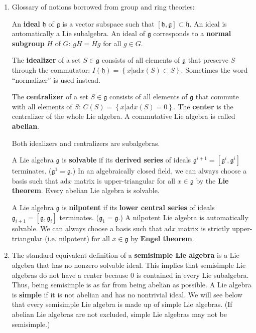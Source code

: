 \documentclass[aps,nofootinbib]{revtex4}
\begin{document}
\begin{enumerate}

\item \label{glossary} Glossary of notions borrowed from group and ring theories:

An \textbf{ideal} $\mathfrak{h}$ of $\mathfrak{g}$ is a vector subspace
such that $\left[\mathfrak{h},\mathfrak{g}\right]\subset\mathfrak{h}$.
An ideal is automatically a Lie subalgebra. An ideal of $\mathfrak{g}$
corresponds to a \textbf{normal subgroup} $H$ of $G$: $gH=Hg$ for
all $g\in G$.

The \textbf{idealizer }of a set $S\in\mathfrak{g}$ consists of all
elements of $\mathfrak{g}$ that preserve $S$ through the commutator:\textbf{
}$I\left(\mathfrak{h}\right)=\left\{ x|\mbox{ad}x\left(S\right)\subset S\right\} $.
Sometimes the word ``normalizer'' is used instead.

The \textbf{centralizer }of a set $S\in\mathfrak{g}$ consists of
all elements of $\mathfrak{g}$ that commute with all elements of
$S$: $C\left(S\right)=\left\{ x|\mbox{ad}x\left(S\right)=0\right\} $.
The \textbf{center }is the centralizer of the whole Lie algebra. A
commutative Lie algebra is called \textbf{abelian}.

Both idealizers and centralizers are subalgebras.

A Lie algebra $\mathfrak{g}$ is \textbf{solvable }if its \textbf{derived
series }of ideals\textbf{ }$\mathfrak{g}^{i+1}=\left[\mathfrak{g}^{i},\mathfrak{g}^{i}\right]$
terminates. ($\mathfrak{g}^{1}=\mathfrak{g}$.) In an algebraically
closed field, we can always choose a basis such that $\mbox{ad}x$
matrix is upper-triangular for all $x\in\mathfrak{g}$ by the \textbf{Lie
theorem}. Every abelian Lie algebra is solvable.

A Lie algebra $\mathfrak{g}$ is \textbf{nilpotent }if its \textbf{lower
central series }of ideals\textbf{ }$\mathfrak{g}_{i+1}=\left[\mathfrak{g},\mathfrak{g}_{i}\right]$
terminates. ($\mathfrak{g}_{1}=\mathfrak{g}$.) A nilpotent Lie algebra
is automatically solvable. We can always choose a basis such that
$\mbox{ad}x$ matrix is strictly upper-triangular (i.e. nilpotent)
for all $x\in\mathfrak{g}$ by \textbf{Engel theorem}.

\item The standard equivalent definition of a \textbf{semisimple Lie
algebra} is a Lie algebra that has no nonzero solvable ideal. This
implies that semisimple Lie algebras do not have a center because
0 is contained in every Lie subalgebra. Thus, being semisimple is
as far from being abelian as possible. A Lie algebra is \textbf{simple
}if it is not abelian and has no nontrivial ideal. We will see below
that every semisimple Lie algebra is made up of simple Lie algebras.
(If abelian Lie algebras are not excluded, simple Lie algebras may
not be semisimple.) 


\end{enumerate}
\end{document}
